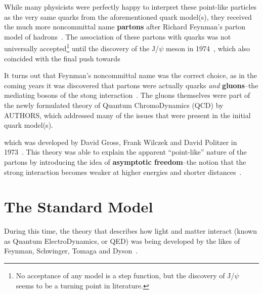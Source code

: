 While many physicists were perfectly happy to interpret these point-like particles as the very same quarks from the aforementioned quark model(s), they received the much more noncommittal name \textbf{partons} after Richard Feynman's parton model of hadrons~\cite{Partons}. The association of these partons with quarks was not universally accepted\footnote{No acceptance of any model is a step function, but the discovery of J/$\psi$ seems to be a turning point in literature.} until the discovery of the J/$\psi$ meson in 1974~\cite{Jpsi}, which also coincided with the final push towards

It turns out that Feynman's noncommittal name was the correct choice, as in the coming years it was discovered that partons were actually quarks \textit{and} \textbf{gluons}--the mediating bosons of the stong interaction~\cite{QCDMGM}. The gluons themselves were part of the newly formulated theory of Quantum ChromoDynamics (QCD) by AUTHORS, which addressed many of the issues that were present in the initial quark model(s). 



which was developed by David Gross, Frank Wilczek and David Politzer in 1973~\cite{QCDGross, QCDWilczek, QCDPolitzer}. This theory was able to explain the apparent ``point-like'' nature of the partons by introducing the idea of \textbf{asymptotic freedom}--the notion that the strong interaction becomes weaker at higher energies and shorter distances~\cite{AsymptoticFreedom}.

\section{The Standard Model}
During this time, the theory that describes how light and matter interact (known as Quantum ElectroDynamics, or QED) was being developed by the likes of Feynman, Schwinger, Tomaga and Dyson~\cite{QEDFeymnan, QEDSchwinger, QEDTomaga, QEDDyson}. 

